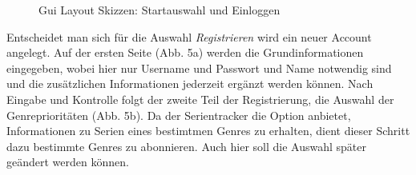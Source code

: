 \begin{figure}[h!]
\centering
\hfill %
\hfill %
\hfill %
\caption{Gui Layout Skizzen: Startauswahl und Einloggen }
\label{gui-skizzen-start-login}
\end{figure}




\newpage

Entscheidet man sich für die Auswahl \textit{Registrieren} wird ein neuer Account angelegt. Auf der ersten Seite (Abb. 5a) werden die Grundinformationen eingegeben, wobei hier nur Username und Passwort und Name notwendig sind und die zusätzlichen Informationen jederzeit ergänzt werden können. Nach Eingabe und Kontrolle folgt der zweite Teil der Registrierung, die Auswahl der Genreprioritäten (Abb. 5b). Da der Serientracker die Option anbietet, Informationen zu Serien eines bestimtmen Genres zu erhalten, dient dieser Schritt dazu bestimmte Genres zu abonnieren. Auch hier soll die Auswahl später geändert werden können.\\

